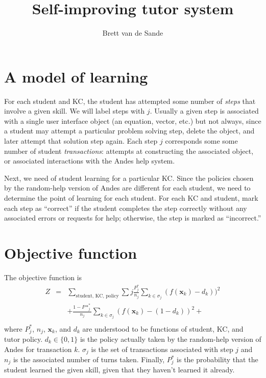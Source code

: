 \documentclass[11pt,letterpaper]{article}
\begin{document}
\title{Self-improving tutor system}
\author{Brett van de Sande}

%


\maketitle

\section{A model of learning}

For each student and KC, the student has attempted some number of 
{\em steps} that involve a given skill.   We will label
steps with $j$.  Usually a given step is associated
with a single user interface object (an equation, vector, etc.)  but
not always, since a student may attempt a particular problem solving
step, delete the object, and later attempt that solution step again.
Each step $j$ corresponds some some number of student {\em transactions}:
attempts at constructing the associated object, or associated
interactions with the Andes help system.  

Next, we need of student learning for a particular KC.
Since the policies chosen by the random-help version of Andes
are different for each student,
we need to determine the point of learning for each student.
For each KC and student, mark each step as ``correct'' if
the student completes the step correctly without any associated errors or 
requests for help; otherwise, the step is marked as ``incorrect.''


\section{Objective function}



The objective function is 
\begin{eqnarray}
  Z&=&\sum_{\mbox{student, KC, policy}} \sum{j}  \frac{P^*_j}{n_j}
  \sum_{k\in \sigma_j} \left(f(\mathbf{x}_k)-d_k\right))^2 \\
 &&+\frac{1-P*^*_j}{n_j}
  \sum_{k\in \sigma_j} \left(f(\mathbf{x}_k)-(1-d_k)\right)^2 + \\
\end{eqnarray}
where $P_j^*$, $n_j$, $\mathbf{x}_k$, and $d_k$ are understood to be
functions of student, KC, and tutor policy.  $d_k\in \{0,1\}$ is the
policy actually taken by the random-help version of Andes for transaction
$k$.  
$\sigma_j$ is the set of transactions associated with step $j$ 
and $n_j$ is the associated number of turns
taken.  Finally, $P^*_j$ is the probability that the student learned the
given skill, given that they haven't learned it already.
\end{document}
